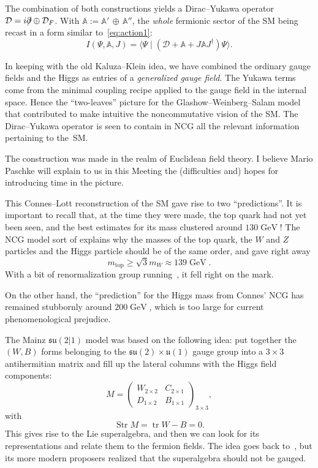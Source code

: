 \documentclass[a4paper,12pt]{article}
\renewcommand{\AA}{\mathbb{A}}      %
\newcommand{\D}{\mathcal{D}}        %
\newcommand{\delslash}{\partial\mkern-9mu/} %
\DeclareMathOperator{\GeV}{GeV}     %
\DeclareMathOperator{\Str}{Str}     %
\newcommand{\stroke}{\mathbin\vert} %
\newcommand{\sul}{\mathfrak{su}}    %
\def\top{\mathrm{top}}              %
\DeclareMathOperator{\tr}{tr}       %
\newcommand{\ul}{\mathfrak{u}}      %
\newcommand{\x}{\times}             %
\newcommand{\1}{\mathbf{1}}         %
\newcommand{\7}{\dagger}            %
\newcommand{\8}{\bullet}            %
\renewcommand{\.}{\cdot}            %
\renewcommand{\:}{\colon}           %
\def\<#1,#2>{\langle#1\stroke#2\rangle} %
\begin{document}
The combination of both constructions yields a Dirac--Yukawa operator
$\D = i\delslash \oplus \D_F$. With $\AA := \AA'\,\oplus\,\AA''$, the
\textit{whole} fermionic sector of the SM being recast in a form
similar to~\eqref{eq:action1}:
\begin{equation}
I(\Psi,\AA,J) = \<\Psi, (\D + \AA + J\AA J^\7) \Psi>.
\label{eq:action2}
\end{equation}

In keeping with the old Kaluza--Klein idea, we have combined the
ordinary gauge fields and the Higgs as entries of a
\textit{generalized gauge field}. The Yukawa terms come from the
minimal coupling recipe applied to the gauge field in the internal
space. Hence the ``two-leaves'' picture for the
Glashow--Weinberg--Salam model~\cite{Sirius, KastlerS} that contributed to make
intuitive the noncommutative vision of the SM. The Dirac--Yukawa
operator is seen to contain in NCG all the relevant information
pertaining to the~SM.

The construction was made in the realm of Euclidean field theory. I
believe Mario Paschke will explain to us in this Meeting the
(difficulties and) hopes for introducing time in the picture.

This Connes--Lott reconstruction of the SM gave rise to two
``predictions''. It is important to recall that, at the time they were
made, the top quark had not yet been seen, and the best estimates for
its mass clustered around $130 \GeV$! The NCG model sort of explains
why the masses of the top quark, the $W$ and $Z$ particles and the
Higgs particle should be of the same order, and gave right away
$$
m_\top \geq \sqrt{3} m_W \approx 139 \GeV.
$$
With a bit of renormalization group running~\cite{Orpheus}, it fell
right on the mark.

On the other hand, the ``prediction'' for the Higgs mass from Connes'
NCG has remained stubbornly around $200 \GeV$, which is too large for
current phenomenological prejudice.

\smallskip

The Mainz $\sul(2|1)$ model was based on the following idea: put
together the $(W,B)$ forms belonging to the $\sul(2) \x \ul(1)$ gauge
group into a $3 \x 3$ antihermitian matrix and fill up the lateral
columns with the Higgs field components:
$$
M = \begin{pmatrix}
W_{2\x2} & C_{2\x1} \\ D_{1\x2} & B_{1\x1}
\end{pmatrix}_{3\x3},
$$
with
$$
\Str M = \tr W - B = 0.
$$
This gives rise to the Lie superalgebra, and then we can look for its
representations and relate them to the fermion fields. The idea goes
back to~\cite{Neeman}, but its more modern proposers realized that the
superalgebra should not be gauged.
\end{document}
